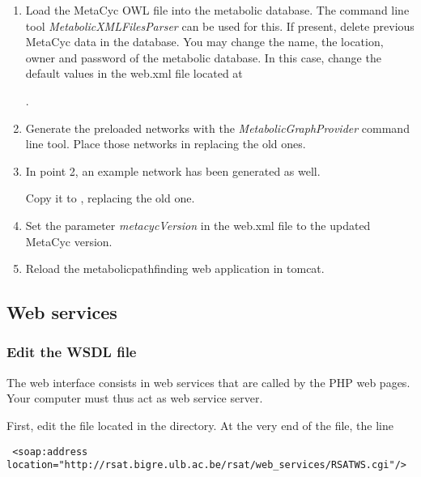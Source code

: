 \documentclass{book}
\begin{document}
\begin{enumerate}

\item Load the MetaCyc OWL file into the metabolic database.
      The command line tool \textit{MetabolicXMLFilesParser} can be used for this.
      If present, delete previous MetaCyc data in the database. You may change the name,
      the location, owner and password of the metabolic database. In this case, change the
      default values in the web.xml file located at

      .

\item Generate the preloaded networks with the \textit{MetabolicGraphProvider} command line tool.
      Place those networks in  replacing the old ones.

\item In point 2, an example network has been generated as well.

      Copy it to
      , replacing the old one.

\item Set the parameter \textit{metacycVersion} in the web.xml file to the updated MetaCyc version.

\item Reload the metabolicpathfinding web application in tomcat.

\end{enumerate}

\subsection{Web services}

\subsubsection{Edit the WSDL file}
The web interface consists in web services that are called by the PHP web pages. Your computer must thus act as web service server.

First, edit the file  located in the
 directory.
At the very end of the file, the line

\begin{lstlisting}
 <soap:address location="http://rsat.bigre.ulb.ac.be/rsat/web_services/RSATWS.cgi"/>
\end{lstlisting}
\end{document}
